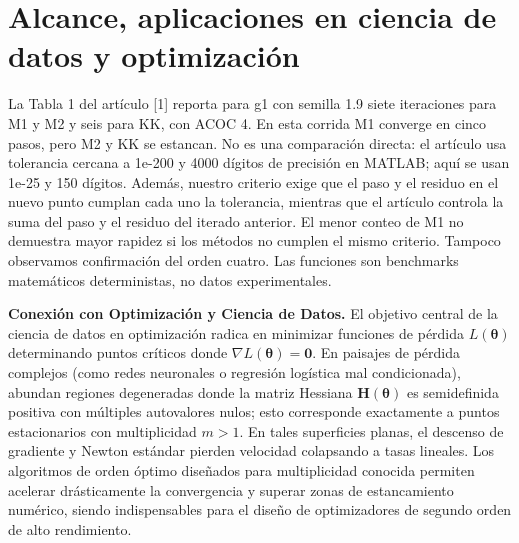 \documentclass[10pt,a4paper]{article}
\begin{document}
\section{Alcance, aplicaciones en ciencia de datos y optimizaci\'on}
La Tabla 1 del artículo [1] reporta para g1 con semilla 1.9 siete iteraciones para M1 y M2 y seis para KK, con ACOC 4. En esta corrida M1 converge en cinco pasos, pero M2 y KK se estancan. No es una comparación directa: el artículo usa tolerancia cercana a 1e-200 y 4000 dígitos de precisión en MATLAB; aquí se usan 1e-25 y 150 dígitos. Además, nuestro criterio exige que el paso y el residuo en el nuevo punto cumplan cada uno la tolerancia, mientras que el artículo controla la suma del paso y el residuo del iterado anterior. El menor conteo de M1 no demuestra mayor rapidez si los métodos no cumplen el mismo criterio. Tampoco observamos confirmación del orden cuatro. Las funciones son benchmarks matemáticos deterministas, no datos experimentales.

\textbf{Conexi\'on con Optimizaci\'on y Ciencia de Datos.} El objetivo central de la ciencia de datos en optimizaci\'on radica en minimizar funciones de p\'erdida $L(\boldsymbol{\theta})$ determinando puntos cr\'iticos donde $\nabla L(\boldsymbol{\theta}) = \mathbf{0}$. En paisajes de p\'erdida complejos (como redes neuronales o regresi\'on log\'istica mal condicionada), abundan regiones degeneradas donde la matriz Hessiana $\mathbf{H}(\boldsymbol{\theta})$ es semidefinida positiva con m\'ultiples autovalores nulos; esto corresponde exactamente a puntos estacionarios con multiplicidad $m > 1$. En tales superficies planas, el descenso de gradiente y Newton est\'andar pierden velocidad colapsando a tasas lineales. Los algoritmos de orden \'optimo dise\~nados para multiplicidad conocida permiten acelerar dr\'asticamente la convergencia y superar zonas de estancamiento num\'erico, siendo indispensables para el dise\~no de optimizadores de segundo orden de alto rendimiento.
\end{document}
